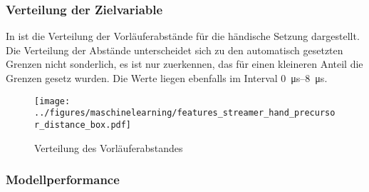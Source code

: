 \subsubsection{Verteilung der Zielvariable}

In  ist die Verteilung der Vorläuferabstände für die händische Setzung dargestellt. Die Verteilung der Abstände unterscheidet sich zu den automatisch gesetzten Grenzen nicht sonderlich, es ist nur zuerkennen, das für einen kleineren Anteil die Grenzen gesetz wurden. Die Werte liegen ebenfalls im Interval \SIrange{0}{8}{\micro\second}. 
\begin{figure}[H]
    \centering
      \texttt{[image: ../figures/maschinelearning/features\_streamer\_hand\_precursor\_distance\_box.pdf]}
      \caption{Verteilung des Vorläuferabstandes}
      \label{fig:streamer_hand_prec_distance_box}
\end{figure}

\subsubsection{Modellperformance}

\begin{table}[h!]
\centering
\caption{Model Performance für die Vorhersage der Vorläuferabstände}
\label{tab:streamer_prec_distance}
\end{table}

